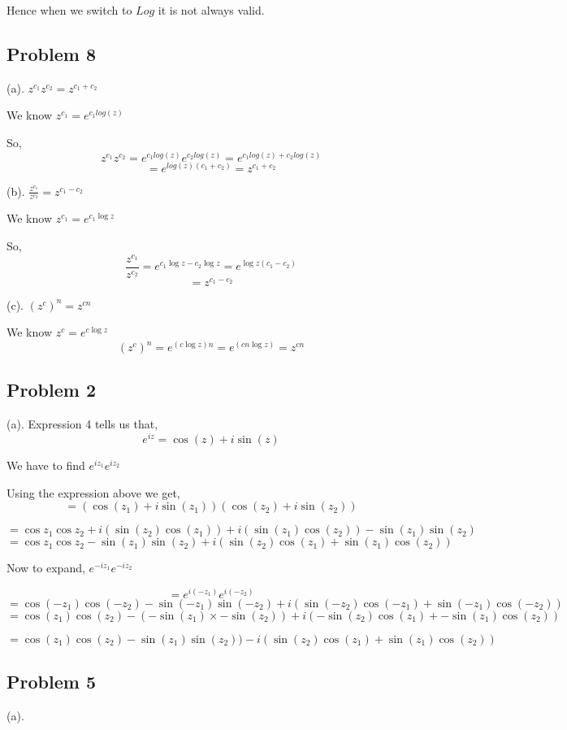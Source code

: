 \documentclass[a4paper]{report}
\begin{document}
 Hence  when we switch to $Log$ it is not always valid.


\subsection*{Problem 8}
(a). $z^{c_1} z^{c_2} = z^{c_1 + c_2}$

We know $z^{c_1} = e^{c_1 log(z)}$

So, 
$$ z^{c_1} z^{c_2} = e^{c_1 log(z)} e^{c_2 log(z)} = e^{c_1 log(z) + c_2log(z)}$$ 
$$ = e^{log(z)(c_1 + c_2)} = z^{c_1 + c_2} $$ 

(b). $\frac{z^{c_1}}{z^{c_2}} = z^{c_1- c_2}$ 

We know $z^{c_1} = e^{c_1 \log z}$

So, 
$$ \frac{z^{c_1}}{z^{c_2}} = e^{c_1 \log z - c_2 \log z}  = e^{\log z(c_1 - c_2)}$$ 
$$ = z^{c_1 - c_2} $$ 


(c). $(z^{c})^n = z^{cn}$


We know $z^{c} = e^{c \log z}$
$$(z^{c})^n = e^{(c \log z)n} = e^{(cn \log z)} = z^{cn}$$


\subsection*{Problem 2}
(a). Expression 4 tells us that, 
$$ e^{iz} = \cos(z) + i\sin(z) $$ 


We have to find $e^{iz_1}e^{iz_2}$

Using the expression above we get, 
$$ = (\cos(z_1) + i\sin(z_1))(\cos(z_2) + i\sin(z_2))$$ 

$$ = \cos{z_1}\cos{z_2} + i(\sin(z_2)\cos(z_1)) + i(\sin(z_1)\cos(z_2)) - \sin(z_1)\sin(z_2) $$ 
$$ = \cos{z_1}\cos{z_2}  - \sin(z_1)\sin(z_2) + i(\sin(z_2)\cos(z_1) + \sin(z_1)\cos(z_2)) $$ 


Now to expand, $e^{-iz_1}e^{-iz_2}$


$$ = e^{i(-z_1)}e^{i(-z_2)} $$
$$ = \cos(-z_1)\cos(-z_2)  - \sin(-z_1)\sin(-z_2) + i(\sin(-z_2)\cos(-z_1) + \sin(-z_1)\cos(-z_2)) $$ 
$$ = \cos(z_1)\cos(z_2)  - (-\sin(z_1)\times -\sin(z_2)) + i(-\sin(z_2)\cos(z_1) + -\sin(z_1)\cos(z_2)) $$ 

$$ = \cos(z_1)\cos(z_2)  - \sin(z_1)\sin(z_2)) - i(\sin(z_2)\cos(z_1) + \sin(z_1)\cos(z_2)) $$ 

\subsection*{Problem 5}
(a).
\end{document}
